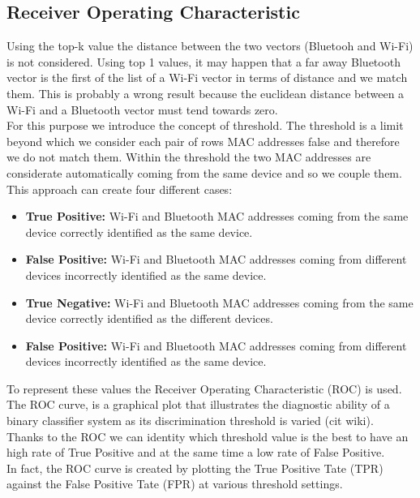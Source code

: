 \subsection{Receiver Operating Characteristic}
Using the top-k value the distance between the two vectors (Bluetooh and Wi-Fi) is not considered. Using top 1 values, it may happen that a far away Bluetooth vector is the first of the list of a Wi-Fi vector in terms of distance and we match them. This is probably a wrong result because the euclidean distance between a Wi-Fi and a Bluetooth vector must tend towards zero.\\
\linebreak
For this purpose we introduce the concept of threshold. The threshold is a limit beyond which we consider each pair of rows MAC addresses false and therefore we do not match them. Within the threshold the two MAC addresses are considerate automatically coming from the same device and so we couple them.\\
\linebreak
This approach can create four different cases:
\begin{itemize}
\item \textbf{True Positive:}  Wi-Fi and Bluetooth MAC addresses coming from the same device correctly identified as the same device.
\item \textbf{False Positive:} Wi-Fi and Bluetooth MAC addresses coming from different devices incorrectly identified as the same device.
\item \textbf{True Negative:} Wi-Fi and Bluetooth MAC addresses coming from the same device correctly identified as the different devices.
\item \textbf{False Positive:} Wi-Fi and Bluetooth MAC addresses coming from different devices incorrectly identified as the same device.
\end{itemize}
To represent these values the Receiver Operating Characteristic (ROC) is used. The ROC curve, is a graphical plot that illustrates the diagnostic ability of a binary classifier system as its discrimination threshold is varied (cit wiki).\\
\linebreak
Thanks to the ROC we can identity which threshold value is the best to have an high rate of True Positive and at the same time a low rate of False Positive.\\
In fact, the ROC curve is created by plotting the True Positive Tate (TPR) against the False Positive Tate (FPR) at various threshold settings.\\
